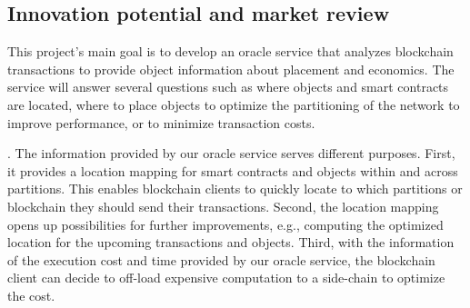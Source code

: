 \subsection{Innovation potential and market review} 

This project's main goal is to develop an oracle service that analyzes
blockchain transactions to provide object information about placement and
economics. The service will answer several questions such as where objects and
smart contracts are located, where to place objects to optimize the partitioning
of the network to improve performance, or to minimize transaction costs.

. The information provided by our oracle service serves
different purposes. First, it provides a location mapping for smart contracts
and objects within and across partitions. This enables blockchain clients to
quickly locate to which partitions or blockchain they should send their
transactions. Second, the location mapping opens up possibilities for further
improvements, e.g., computing the optimized location for the upcoming
transactions and objects. Third, with the information of the execution cost and
time provided by our oracle service, the blockchain client can decide to
off-load expensive computation to a side-chain to optimize the cost. 



